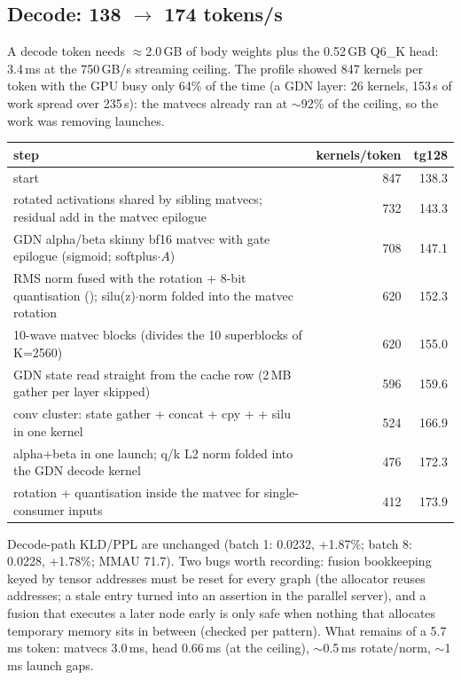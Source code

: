 \documentclass[10pt,a4paper]{article}
\newcommand{\tx}[1]{\texttt{\detokenize{#1}}}
\begin{document}
\subsection{Decode: 138 $\to$ 174 tokens/s}
A decode token needs $\approx$2.0\,GB of body weights plus the 0.52\,GB Q6\_K head: 3.4\,ms at the 750\,GB/s streaming ceiling. The profile showed 847
kernels per token with the GPU busy only 64\% of the time (a GDN layer: 26 kernels, 153\,\textmu s of work spread over 235\,\textmu s): the matvecs
already ran at $\sim$92\% of the ceiling, so the work was removing launches.
\begin{center}\small
\begin{tabular}{@{}p{10.5cm}rr@{}}
\toprule
step & kernels/token & tg128\\
\midrule
start & 847 & 138.3\\
rotated activations shared by sibling matvecs; residual add in the matvec epilogue & 732 & 143.3\\
GDN alpha/beta skinny bf16 matvec with gate epilogue (sigmoid; softplus$\cdot A$) & 708 & 147.1\\
RMS norm fused with the rotation + 8-bit quantisation (\tx{k_rmsnorm_rot_q8x}); silu(z)$\cdot$norm folded into the matvec rotation & 620 & 152.3\\
10-wave matvec blocks (divides the 10 superblocks of K=2560) & 620 & 155.0\\
GDN state read straight from the cache row (2\,MB gather per layer skipped) & 596 & 159.6\\
conv cluster: state gather + concat + cpy + \tx{ssm_conv} + silu in one kernel & 524 & 166.9\\
alpha+beta in one launch; q/k L2 norm folded into the GDN decode kernel & 476 & 172.3\\
rotation + quantisation inside the matvec for single-consumer inputs & 412 & 173.9\\
\bottomrule
\end{tabular}
\end{center}
Decode-path KLD/PPL are unchanged (batch 1: 0.0232, +1.87\%; batch 8: 0.0228, +1.78\%; MMAU 71.7). Two bugs worth recording: fusion bookkeeping keyed by tensor
addresses must be reset for every graph (the allocator reuses addresses; a stale entry turned into an assertion in the parallel server), and a fusion that executes a
later node early is only safe when nothing that allocates temporary memory sits in between (checked per pattern). What remains of a 5.7\,ms token:
matvecs 3.0\,ms, head 0.66\,ms (at the ceiling), $\sim$0.5\,ms rotate/norm, $\sim$1\,ms launch gaps.
\end{document}
